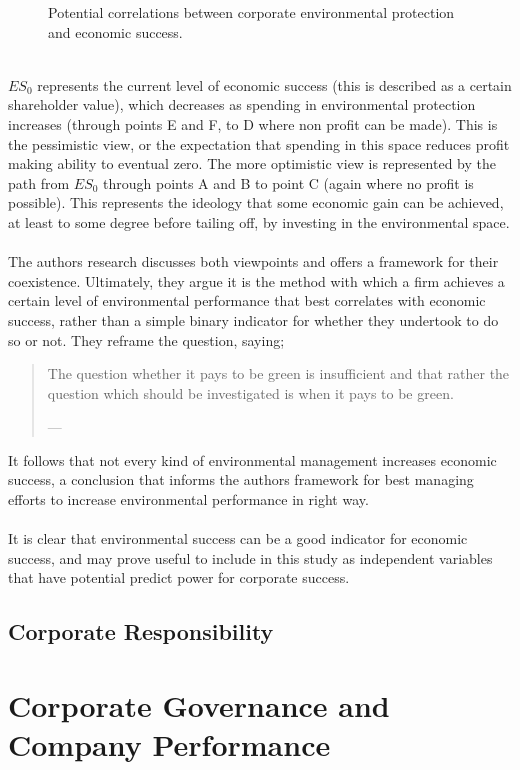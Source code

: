 {\begin{figure}[h]
\caption{Potential correlations between corporate environmental protection and economic success.}
\label{ch3_successAndEnviornment}
\end{figure}\\
$ES_0$ represents the current level of economic success (this is described as a certain shareholder value), which decreases as spending in environmental protection increases (through points E and F, to D where non profit can be made). This is the pessimistic view, or the expectation that spending in this space reduces profit making ability to eventual zero. The more optimistic view is represented by the path from $ES_0$ through points A and B to point C (again where no profit is possible). This represents the ideology that some economic gain can be achieved, at least to some degree before tailing off, by investing in the environmental space. \\\\
The authors research discusses both viewpoints and offers a framework for their coexistence. Ultimately, they argue it is the method with which a firm achieves a certain level of environmental performance that best correlates with economic success, rather than a simple binary indicator for whether they undertook to do so or not. They reframe the question, saying;
\begin{quote}
The question whether it pays to be green is insufficient and that rather the question which should be investigated is when it pays to be green.

\hspace{2cm}--- \cite{schaltegger2002link}
\end{quote}
It follows that not every kind of environmental management increases economic success, a conclusion that informs the authors framework for best managing efforts to increase environmental performance in right way. \\\\
It is clear that environmental success can be a good indicator for economic success, and may prove useful to include in this study as independent variables that have potential predict power for corporate success. 
}
\subsection{Corporate Responsibility}
\section{Corporate Governance and Company Performance}
